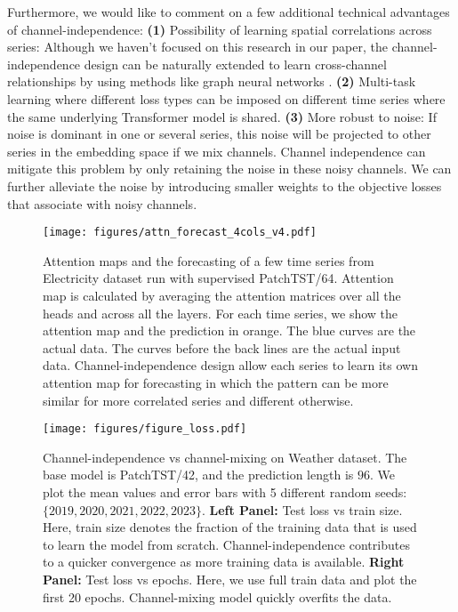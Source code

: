 \documentclass{article} \usepackage{iclr2023_conference,times}
\begin{document}
Furthermore, we would like to comment on a few additional technical advantages of channel-independence: \textbf{(1)} Possibility of learning spatial correlations across series: Although we haven't focused on this research in our paper, the channel-independence design can be naturally extended to learn cross-channel relationships by using methods like graph neural networks \citep{graph1,graph2}. \textbf{(2)} Multi-task learning where different loss types can be imposed on different time series where the same underlying Transformer model is shared. \textbf{(3)} More robust to noise: If noise is dominant in one or several series, this noise will be projected to other series in the embedding space if we mix channels. Channel independence can mitigate this problem by only retaining the noise in these noisy channels. We can further alleviate the noise by introducing smaller weights to the objective losses that associate with noisy channels.

\begin{figure}[h]
\hspace*{-0.5cm}
\texttt{[image: figures/attn\_forecast\_4cols\_v4.pdf]}
\caption{Attention maps and the forecasting of a few time series from Electricity dataset run with supervised PatchTST/64. Attention map is calculated by averaging the attention matrices over all the heads and across all the layers. For each time series, we show the attention map and the prediction in orange. The blue curves are the actual data. The curves before the back lines are the actual input data. Channel-independence design allow each series to learn its own attention map for forecasting in which the pattern can be more similar for more correlated series and different otherwise.}
\label{fig::attnmap}
\end{figure}

\begin{figure}[htbp!]
\begin{center}
\texttt{[image: figures/figure\_loss.pdf]}
\end{center}
\caption{Channel-independence vs channel-mixing on Weather dataset. The base model is PatchTST/42, and the prediction length is $96$. We plot the mean values and error bars with 5 different random seeds: $\{2019,2020,2021,2022,2023\}$. \textbf{Left Panel:} Test loss vs train size. Here, train size denotes the fraction of the training data that is used to learn the model from scratch. Channel-independence contributes to a quicker convergence as more training data is available. \textbf{Right Panel:} Test loss vs epochs. Here, we use full train data and plot the first 20 epochs. Channel-mixing model quickly overfits the data.}
\label{fig::weather}
\end{figure}
\end{document}
